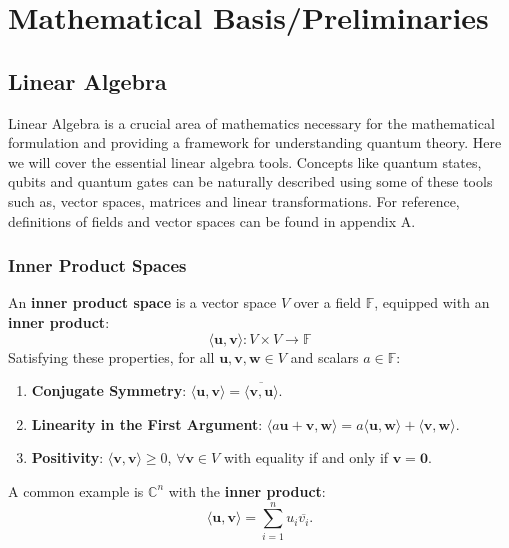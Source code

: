 \section{Mathematical Basis/Preliminaries}

\subsection{Linear Algebra}

Linear Algebra is a crucial area of mathematics necessary for the mathematical formulation and providing a framework for understanding quantum theory. Here we will cover the essential linear algebra tools. Concepts like quantum states, qubits and quantum gates can be naturally described using some of these tools such as, vector spaces, matrices and linear transformations. For reference, definitions of fields and vector spaces can be found in appendix A.



\subsubsection{Inner Product Spaces}

An \textbf{inner product space} is a vector space \( V \) over a field \( \mathbb{F} \), equipped with an \textbf{inner product}:
\[
\langle \mathbf{u}, \mathbf{v} \rangle: V \times V \to \mathbb{F}
\]
Satisfying these properties, for all \( \mathbf{u}, \mathbf{v}, \mathbf{w} \in V \) and scalars \( a \in \mathbb{F} \):
\begin{enumerate}
    \item \textbf{Conjugate Symmetry}: \( \langle \mathbf{u}, \mathbf{v} \rangle = \overline{\langle \mathbf{v}, \mathbf{u} \rangle} \).
    \item \textbf{Linearity in the First Argument}: \( \langle a\mathbf{u} + \mathbf{v}, \mathbf{w} \rangle = a \langle \mathbf{u}, \mathbf{w} \rangle + \langle \mathbf{v}, \mathbf{w} \rangle \).
    \item \textbf{Positivity}: \( \langle \mathbf{v}, \mathbf{v} \rangle \geq 0 \), \(\forall \mathbf{v} \in V\)
 with equality if and only if \( \mathbf{v} = \mathbf{0} \).
\end{enumerate}


\noindent A common example is \( \mathbb{C}^n \) with the \textbf{inner product}:
\begin{equation}
\langle \mathbf{u}, \mathbf{v} \rangle = \sum_{i=1}^{n} u_i \overline{v_i}.
\end{equation}

